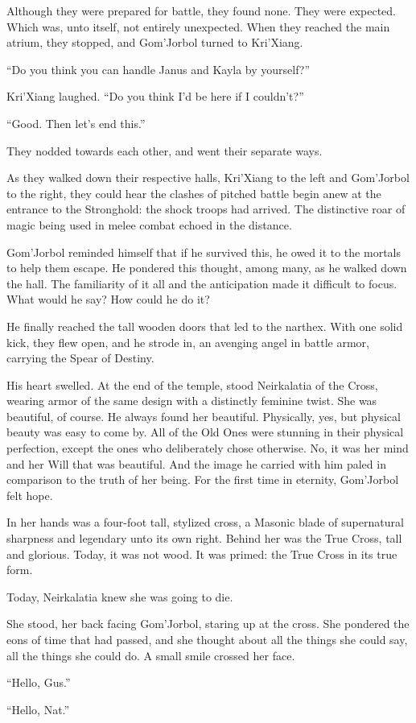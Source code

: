 Although they were prepared for battle, they found none. They were expected. Which was, unto itself, not entirely unexpected. When they reached the main atrium, they stopped, and Gom’Jorbol turned to Kri’Xiang.

“Do you think you can handle Janus and Kayla by yourself?”

Kri’Xiang laughed. “Do you think I’d be here if I couldn’t?”

“Good. Then let’s end this.”

They nodded towards each other, and went their separate ways.

As they walked down their respective halls, Kri’Xiang to the left and Gom’Jorbol to the right, they could hear the clashes of pitched battle begin anew at the entrance to the Stronghold: the shock troops had arrived. The distinctive roar of magic being used in melee combat echoed in the distance.

Gom’Jorbol reminded himself that if he survived this, he owed it to the mortals to help them escape. He pondered this thought, among many, as he walked down the hall. The familiarity of it all and the anticipation made it difficult to focus. What would he say? How could he do it?

He finally reached the tall wooden doors that led to the narthex. With one solid kick, they flew open, and he strode in, an avenging angel in battle armor, carrying the Spear of Destiny.

His heart swelled. At the end of the temple, stood Neirkalatia of the Cross, wearing armor of the same design with a distinctly feminine twist. She was beautiful, of course. He always found her beautiful. Physically, yes, but physical beauty was easy to come by. All of the Old Ones were stunning in their physical perfection, except the ones who deliberately chose otherwise. No, it was her mind and her Will that was beautiful. And the image he carried with him paled in comparison to the truth of her being. For the first time in eternity, Gom’Jorbol felt hope.

In her hands was a four-foot tall, stylized cross, a Masonic blade of supernatural sharpness and legendary unto its own right. Behind her was the True Cross, tall and glorious. Today, it was not wood. It was primed: the True Cross in its true form.

Today, Neirkalatia knew she was going to die.

She stood, her back facing Gom’Jorbol, staring up at the cross. She pondered the eons of time that had passed, and she thought about all the things she could say, all the things she could do. A small smile crossed her face.

“Hello, Gus.”

“Hello, Nat.”
